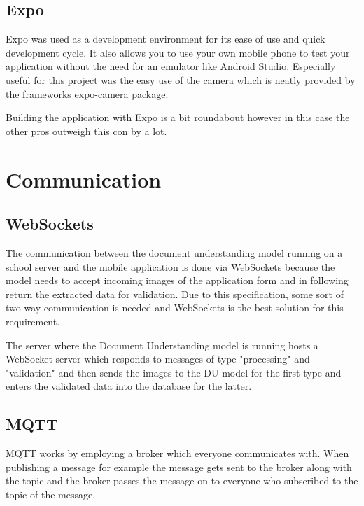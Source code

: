 \subsection{Expo}

Expo was used as a development environment for its ease of use and quick development cycle.
It also allows you to use your own mobile phone to test your application without the need for an emulator like Android Studio.
Especially useful for this project was the easy use of the camera which is neatly provided by the frameworks expo-camera package.

\cite{ExpoOverview}

Building the application with Expo is a bit roundabout however in this case the other pros outweigh this con by a lot.

\section{Communication}

\subsection{WebSockets}

The communication between the document understanding model running on a school server and the mobile application is done via WebSockets because the model needs to accept incoming images of the application form and in following return the extracted data for validation.
Due to this specification, some sort of two-way communication is needed and WebSockets is the best solution for this requirement.

The server where the Document Understanding model is running hosts a WebSocket server which responds to messages of type "processing" and "validation" and then sends the images to the DU model for the first type and enters the validated data into the database for the latter.

\subsection{MQTT}

MQTT works by employing a broker which everyone communicates with. When publishing a message for example the message gets sent to the broker along with the topic and the broker passes the message on to everyone who subscribed to the topic of the message.

